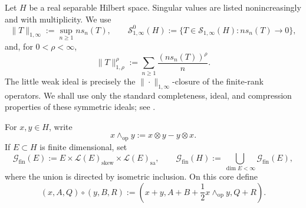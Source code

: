 \documentclass[10pt,reqno]{amsart}
\theoremstyle{plain}
\theoremstyle{definition}
\theoremstyle{remark}
\begin{document}
Let \(H\) be a real separable Hilbert space.  Singular values are listed
nonincreasingly and with multiplicity.  We use
\[
 \|T\|_{1,\infty}:=\sup_{n\geq1}n s_n(T),
 \qquad
 \mathcal S^0_{1,\infty}(H)
 :=\{T\in\mathcal S_{1,\infty}(H):ns_n(T)\longrightarrow0\},
\]
and, for \(0<\rho<\infty\),
\[
 \|T\|_{1,\rho}^{\rho}
 :=\sum_{n\geq1}\frac{(n s_n(T))^{\rho}}{n}.
\]
The little weak ideal is precisely the
\(\|\cdot\|_{1,\infty}\)-closure of the finite-rank operators.  We shall
use only the standard completeness, ideal, and compression properties of
these symmetric ideals; see
\cite{Pietsch80,Simon05,LordSukochevZanin12}.

For \(x,y\in H\), write
\[
 x\wedge_{\mathrm{op}}y:=x\otimes y-y\otimes x.
\]
If \(E\subset H\) is finite dimensional, set
\[
 \mathscr G_{\mathrm{fin}}(E)
 :=E\times\mathcal L(E)_{\mathrm{skew}}
       \times\mathcal L(E)_{\mathrm{sa}},
 \qquad
 \mathscr G_{\mathrm{fin}}(H)
 :=\bigcup_{\dim E<\infty}\mathscr G_{\mathrm{fin}}(E),
\]
where the union is directed by isometric inclusion.  On this core define
\begin{equation}
 (x,A,Q)\circ(y,B,R)
 :=\left(x+y,A+B+\frac12x\wedge_{\mathrm{op}}y,Q+R\right).
 \label{cc:eq-critical-split-product}
\end{equation}
\end{document}
